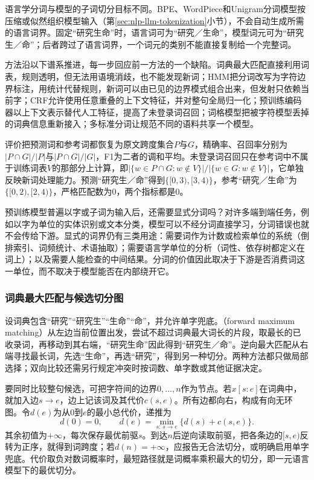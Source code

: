 语言学分词与模型的子词切分目标不同。BPE、WordPiece和Unigram分词模型按压缩或似然组织模型输入（第\ref{sec:nlp-llm-tokenization}小节），不会自动生成所需的语言词界。固定“研究生命”时，语言词可为“研究／生命”，模型词元可为“研究生／命”；后者跨过了语言词界，一个词元的类别不能直接复制给一个完整词。

方法沿以下谱系推进，每一步回应前一方法的一个缺陷。词典最大匹配直接利用词表，规则透明，但无法用语境消歧，也不能发现新词；HMM把分词改写为字符边界标注，用统计代替规则，新词可以由已见的边界模式组合出来，但发射只依赖当前字；CRF允许使用任意重叠的上下文特征，并对整句全局归一化；预训练编码器以上下文表示替代人工特征，提高了未登录词召回；词格模型把被字符模型丢掉的词典信息重新接入；多标准分词让规范不同的语料共享一个模型。

评价把预测词和参考词都恢复为原文跨度集合$P$与$G$，精确率、召回率分别为$|P\cap G|/|P|$与$|P\cap G|/|G|$，F1为二者的调和平均。未登录词召回只在参考词中不属于训练词表$V$的那部分上计算，即$|\{w\in P\cap G:w\notin V\}|/|\{w\in G:w\notin V\}|$，它单独反映新词处理能力。预测“研究生／命”得到$\{[0,3),[3,4)\}$，参考“研究／生命”为$\{[0,2),[2,4)\}$，严格匹配数为0，两个指标都是0。

预训练模型普遍以字或子词为输入后，还需要显式分词吗？对许多端到端任务，例如以字为单位的实体识别或文本分类，模型可以不经分词直接学习，分词错误也就不会传给下游。显式的词界仍有三类用途：需要词作为计数或检索单位的系统（倒排索引、词频统计、术语抽取）；需要语言学单位的分析（词性、依存树都定义在词上）；以及需要人能检查的中间结果。分词的价值因此取决于下游是否消费词这一单位，而不取决于模型能否在内部绕开它。

\subsubsection{词典最大匹配与候选切分图}
\label{sec:nlp-analysis-dictionary}

设词典包含“研究”“研究生”“生命”“命”，并允许单字兜底。（forward maximum matching）从左边当前位置出发，尝试不超过词典最大词长的片段，取最长的已收录词，再移动到其右端，“研究生命”因此得到“研究生／命”。逆向最大匹配从右端寻找最长词，先选“生命”，再选“研究”，得到另一种切分。两种方法都只做局部选择；双向比较还需另行规定冲突时按词数、单字数或其他证据决定。

要同时比较整句候选，可把字符间的边界$0,\ldots,n$作为节点。若$x[s:e]$在词典中，就加入边$s\to e$，边上记该词及其代价$c(s,e)$。所有边都向右，构成有向无环图。令$d(e)$为从0到$e$的最小总代价，递推为
\begin{equation}
  d(0)=0,\qquad
  d(e)=\min_{s:\,s\to e}\{d(s)+c(s,e)\}.
  \label{eq:nlp-analysis-word-path}
\end{equation}
其余初值为$+\infty$，每次保存最优前驱$s$。到达$n$后逆向读取前驱，把各条边的$[s,e)$反转为正序，就得到词跨度；若$d(n)=+\infty$，应报告无合法切分，或明确启用单字兜底。代价取负对数词概率时，最短路径就是词概率乘积最大的切分，即一元语言模型下的最优切分。

